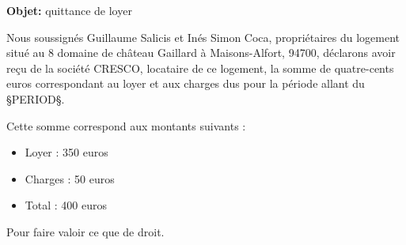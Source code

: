 \documentclass[11pt]{letter}
\date{§DATE§}
\begin{document}
\begin{letter}{}
\opening{\textbf{Objet:} quittance de loyer}

\vspace{5mm}
\hspace{5mm} Nous soussignés Guillaume Salicis et Inés Simon Coca, propriétaires du logement situé au 8 domaine de château Gaillard à Maisons-Alfort, 94700, déclarons avoir reçu de la société CRESCO, locataire de ce logement, la somme de quatre-cents euros correspondant au loyer et aux charges dus pour la période allant du §PERIOD§.

\vspace{5mm}
Cette somme correspond aux montants suivants :
\begin{itemize}   
\item Loyer : 350 euros
\item Charges : 50 euros
\item Total : 400 euros
\end{itemize}

\closing{Pour faire valoir ce que de droit.}
\end{letter}
\end{document}
